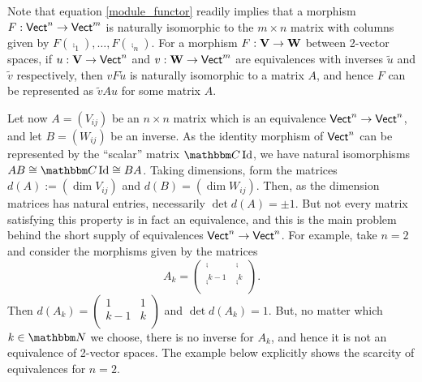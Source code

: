 Note that equation \eqref{module_functor} readily implies that a morphism $F:\mathsf{Vect}^n\to \mathsf{Vect}^m$ is naturally isomorphic to the $m\times n$ matrix with columns given by $F(\comp_1),\dots ,F(\comp_n)$. For a morphism $F:{\bf V}\to {\bf W}$ between 2-vector spaces, if $u:{\bf V}\to \mathsf{Vect}^n$ and $v:{\bf W}\to \mathsf{Vect}^m$ are equivalences with inverses $\widetilde{u}$ and $\widetilde{v}$ respectively, then $vF\widetilde{u}$ is naturally isomorphic to a matrix $A$, and hence $F$ can be represented as $\widetilde{v}Au$ for some matrix $A$.

Let now $A=(V_{ij})$ be an $n\times n$ matrix which is an equivalence $\mathsf{Vect}^n\to \mathsf{Vect}^n$, and let $B=(W_{ij})$ be an inverse. As the identity morphism of $\mathsf{Vect}^n$ can be represented by the ``scalar'' matrix $\comp \opnm{Id}$, we have natural isomorphisms $AB\cong \comp \opnm{Id} \cong BA$. Taking dimensions, form the matrices $d(A):=(\dim V_{ij})$ and $d(B)=(\dim W_{ij})$. Then, as the dimension matrices has natural entries, necessarily $\det d(A)=\pm 1$. But not every matrix satisfying this property is in fact an equivalence, and this is the main problem behind the short supply of equivalences $\mathsf{Vect}^n\to \mathsf{Vect}^n$. For example, take $n=2$ and consider the morphisms given by the matrices
$$A_k=
\begin{pmatrix}
\comp & \comp \\
\comp^{k-1} & \comp^k \\
\end{pmatrix}.
$$
Then $d(A_k)=\left (\begin{smallmatrix} 1 & 1 \\ k-1 & k \\ \end{smallmatrix} \right )$ and $\det d(A_k)=1$. But, no matter which $k\in \natu$ we choose, there is no inverse for $A_k$, and hence it is not an equivalence of 2-vector spaces. The example below explicitly shows the scarcity of equivalences for $n=2$.

